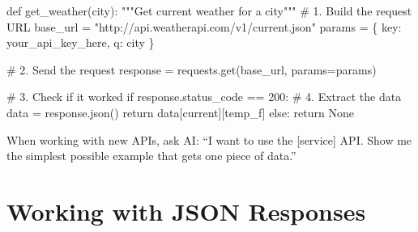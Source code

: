 \documentclass[
  letterpaper,
  DIV=11,
  numbers=noendperiod,
  oneside]{scrreprt}
\newenvironment{Shaded}{}{}
\newcommand{\CommentTok}[1]{\textcolor[rgb]{0.42,0.45,0.49}{#1}}
\newcommand{\ControlFlowTok}[1]{\textcolor[rgb]{0.84,0.23,0.29}{#1}}
\newcommand{\DecValTok}[1]{\textcolor[rgb]{0.00,0.36,0.77}{#1}}
\newcommand{\KeywordTok}[1]{\textcolor[rgb]{0.84,0.23,0.29}{#1}}
\newcommand{\NormalTok}[1]{\textcolor[rgb]{0.14,0.16,0.18}{#1}}
\newcommand{\OperatorTok}[1]{\textcolor[rgb]{0.14,0.16,0.18}{#1}}
\newcommand{\StringTok}[1]{\textcolor[rgb]{0.01,0.18,0.38}{#1}}
\newcommand{\VariableTok}[1]{\textcolor[rgb]{0.89,0.38,0.04}{#1}}
\begin{document}
\begin{Shaded}
\begin{Highlighting}[]
\KeywordTok{def}\NormalTok{ get\_weather(city):}
    \CommentTok{"""Get current weather for a city"""}
    \CommentTok{\# 1. Build the request URL}
\NormalTok{    base\_url }\OperatorTok{=} \StringTok{"http://api.weatherapi.com/v1/current.json"}
\NormalTok{    params }\OperatorTok{=}\NormalTok{ \{}
        \StringTok{\textquotesingle{}key\textquotesingle{}}\NormalTok{: }\StringTok{\textquotesingle{}your\_api\_key\_here\textquotesingle{}}\NormalTok{,}
        \StringTok{\textquotesingle{}q\textquotesingle{}}\NormalTok{: city}
\NormalTok{    \}}
    
    \CommentTok{\# 2. Send the request}
\NormalTok{    response }\OperatorTok{=}\NormalTok{ requests.get(base\_url, params}\OperatorTok{=}\NormalTok{params)}
    
    \CommentTok{\# 3. Check if it worked}
    \ControlFlowTok{if}\NormalTok{ response.status\_code }\OperatorTok{==} \DecValTok{200}\NormalTok{:}
        \CommentTok{\# 4. Extract the data}
\NormalTok{        data }\OperatorTok{=}\NormalTok{ response.json()}
        \ControlFlowTok{return}\NormalTok{ data[}\StringTok{\textquotesingle{}current\textquotesingle{}}\NormalTok{][}\StringTok{\textquotesingle{}temp\_f\textquotesingle{}}\NormalTok{]}
    \ControlFlowTok{else}\NormalTok{:}
        \ControlFlowTok{return} \VariableTok{None}
\end{Highlighting}
\end{Shaded}

\begin{tcolorbox}[enhanced jigsaw, opacityback=0, colback=white, colframe=quarto-callout-tip-color-frame, breakable, titlerule=0mm, coltitle=black, rightrule=.15mm, colbacktitle=quarto-callout-tip-color!10!white, left=2mm, bottomtitle=1mm, bottomrule=.15mm, title=\textcolor{quarto-callout-tip-color}{\faLightbulb}\hspace{0.5em}{AI Partnership Pattern}, opacitybacktitle=0.6, toptitle=1mm, leftrule=.75mm, arc=.35mm, toprule=.15mm]

When working with new APIs, ask AI: ``I want to use the {[}service{]}
API. Show me the simplest possible example that gets one piece of
data.''

\end{tcolorbox}

\section{Working with JSON Responses}\label{working-with-json-responses}
\end{document}
